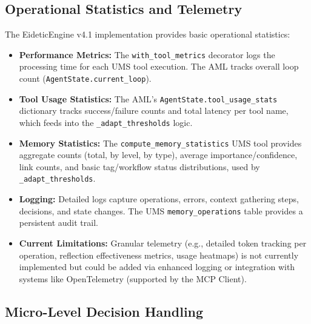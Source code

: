 \documentclass[12pt,a4paper]{article}
\newcommand{\code}[1]{\nolinkurl{#1}}
\begin{document}
\subsection{Operational Statistics and Telemetry}

The EideticEngine v4.1 implementation provides basic operational statistics:

\begin{itemize}
    \item \textbf{Performance Metrics:} The \code{with\_tool\_metrics} decorator logs the processing time for each UMS tool execution. The AML tracks overall loop count (\code{AgentState.current\_loop}).
    \item \textbf{Tool Usage Statistics:} The AML's \code{AgentState.tool\_usage\_stats} dictionary tracks success/failure counts and total latency per tool name, which feeds into the \code{\_adapt\_thresholds} logic.
    \item \textbf{Memory Statistics:} The \code{compute\_memory\_statistics} UMS tool provides aggregate counts (total, by level, by type), average importance/confidence, link counts, and basic tag/workflow status distributions, used by \code{\_adapt\_thresholds}.
    \item \textbf{Logging:} Detailed logs capture operations, errors, context gathering steps, decisions, and state changes. The UMS \code{memory\_operations} table provides a persistent audit trail.
    \item \textbf{Current Limitations:} Granular telemetry (e.g., detailed token tracking per operation, reflection effectiveness metrics, usage heatmaps) is not currently implemented but could be added via enhanced logging or integration with systems like OpenTelemetry (supported by the MCP Client).
\end{itemize}

\subsection{Micro-Level Decision Handling}
\end{document}
